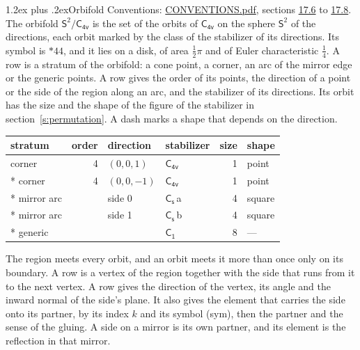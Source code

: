\documentclass[10pt,a4paper]{article}
\makeatletter
\renewcommand\section{\@startsection{section}{1}{\z@}{-3ex plus -1ex minus -.2ex}%
  {1.2ex plus .2ex}{\normalfont\large\sffamily\bfseries\color{parttitle}}}
\numberwithin{equation}{section}
\newcommand{\grp}[1]{\mathsf{#1}}
\newcommand{\orbname}[1]{#1}
\newcommand{\clsletter}[1]{\,{\scriptsize\color{black!55}#1}}
\newcommand{\dirvec}[3]{(#1, #2, #3)}
\newcommand{\twosphere}{\mathsf{S}^{2}}
\makeatother
\begin{document}
\section{Orbifold}\label{s:orbifold}
Conventions: \href{../../CONVENTIONS.pdf}{CONVENTIONS.pdf}, sections \href{../../CONVENTIONS.pdf\#conv.17.6}{17.6} to \href{../../CONVENTIONS.pdf\#conv.17.8}{17.8}.
The orbifold $\twosphere/\grp{C_{4v}}$ is the set of the orbits of $\grp{C_{4v}}$ on the sphere $\twosphere$ of the directions, each orbit marked by the class of the stabilizer of its directions. Its symbol is $\orbname{{\ast}44}$, and it lies on a disk, of area $\tfrac{1}{2}\pi$ and of Euler characteristic $\tfrac{1}{4}$.
\leavevmode\label{n:head.stratum}\label{n:head.order.point}\label{n:head.direction}\label{n:head.stabilizer}\label{n:head.size.orbit}\label{n:head.shape}A row is a stratum of the orbifold: a cone point, a corner, an arc of the mirror edge or the generic points. A row gives the order of its points, the direction of a point or the side of the region along an arc, and the stabilizer of its directions. Its orbit has the size and the shape of the figure of the stabilizer in section~\ref{s:permutation}. A dash marks a shape that depends on the direction.
{\small\setlength{\tabcolsep}{4pt}\begin{longtable}{@{}lrllrl@{}}\toprule
stratum & order & direction & stabilizer & size & shape\\\midrule\endhead
\bottomrule\endfoot\endlastfoot
corner & 4 & $\dirvec{0}{0}{1}$ & \href{C4v.pdf}{$\grp{C_{4v}}$} & 1 & point\\*
corner & 4 & $\dirvec{0}{0}{-1}$ & \href{C4v.pdf}{$\grp{C_{4v}}$} & 1 & point\\*
mirror arc &  & side 0 & \href{C1v.pdf}{$\grp{C_{s}}$}\clsletter{a} & 4 & square\\*
mirror arc &  & side 1 & \href{C1v.pdf}{$\grp{C_{s}}$}\clsletter{b} & 4 & square\\*
generic &  &  & \href{C1.pdf}{$\grp{C_{1}}$} & 8 & ---\\
\bottomrule\end{longtable}}
\leavevmode\label{n:head.vertex.region}\label{n:head.angle}\label{n:head.normal.side}\label{n:head.partner}\label{n:head.sense}The region meets every orbit, and an orbit meets it more than once only on its boundary. A row is a vertex of the region together with the side that runs from it to the next vertex. A row gives the direction of the vertex, its angle and the inward normal of the side's plane. It also gives the element that carries the side onto its partner, by its index $k$ and its symbol (sym), then the partner and the sense of the gluing. A side on a mirror is its own partner, and its element is the reflection in that mirror.
\end{document}
